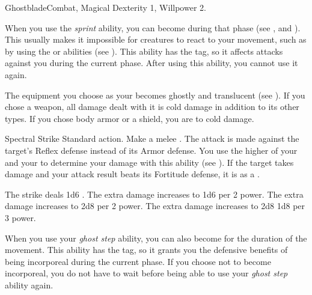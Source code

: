     \begin{magicalfeat}{Ghostblade}{Combat, Magical}
        \featpre Dexterity 1, Willpower 2.

         When you use the \textit{sprint} ability, you can become  during that phase (see , and ).
        This usually makes it impossible for creatures to react to your movement, such as by using the  or  abilities (see ).
        This ability has the  tag, so it affects attacks against you during the current phase.
        After using this ability, you  cannot use it again.

         The equipment you choose as your  becomes ghostly and translucent (see ).
        If you chose a weapon, all damage dealt with it is cold damage in addition to its other types.
        If you chose body armor or a shield, you are  to cold damage.

        \begin{magicalactiveability}{Spectral Strike}
            \abilityusagetime Standard action.
            \rankline
            Make a melee .
            The attack is made against the target's Reflex defense instead of its Armor defense.
            You use the higher of your  and your  to determine your damage with this ability (see ).
            \hit If the target takes damage and your attack result beats its Fortitude defense, it is \slowed as a .

            \rankline
             The strike deals 1d6 .
             The extra damage increases to 1d6  per 2 power.
             The extra damage increases to 2d8  per 2 power.
             The extra damage increases to 2d8 \add 1d8 per 3 power.
        \end{magicalactiveability}

         When you use your \textit{ghost step} ability, you can also become  for the duration of the movement.
        This ability has the  tag, so it grants you the defensive benefits of being incorporeal during the current phase.
        If you choose not to become incorporeal, you do not have to wait  before being able to use your \textit{ghost step} ability again.


\end{magicalfeat}
